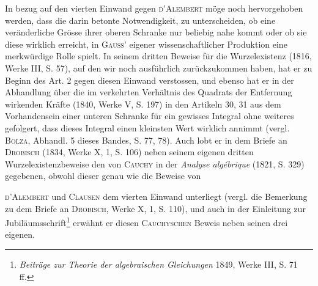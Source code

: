 In bezug auf den vierten Einwand gegen \textsc{d’Alembert} möge noch hervorgehoben
werden, dass die darin betonte Notwendigkeit, zu unterscheiden, ob
eine veränderliche Grösse ihrer oberen Schranke nur beliebig nahe kommt
oder ob sie diese wirklich erreicht, in \textsc{Gauss’} eigener wissenschaftlicher Produktion
eine merkwürdige Rolle spielt. In seinem dritten Beweise für die
Wurzelexistenz (1816, Werke III, S. 57), auf den wir noch ausführlich zurückzukommen
haben, hat er zu Beginn des Art. 2 gegen diesen Einwand verstossen,
und ebenso hat er in der Abhandlung über die im verkehrten Verhältnis
des Quadrats der Entfernung wirkenden Kräfte (1840, Werke V, S. 197)
in den Artikeln 30, 31 aus dem Vorhandensein einer unteren Schranke für
ein gewisses Integral ohne weiteres gefolgert, dass dieses Integral einen kleinsten
Wert wirklich annimmt (vergl. \textsc{Bolza}, Abhandl. 5 dieses Bandes, S. 77, 78).
Auch lobt er in dem Briefe an \textsc{Drobisch} (1834, Werke X, 1, S. 106) neben
seinem eigenen dritten Wurzelexistenzbeweise den von \textsc{Cauchy} in der \textit{Analyse
algébrique} (1821, S. 329) gegebenen, obwohl dieser genau wie die Beweise von\par
\clearpage{}
\noindent \textsc{d’Alembert} und \textsc{Clausen} dem vierten Einwand unterliegt (vergl. die Bemerkung
zu dem Briefe an \textsc{Drobisch}, Werke X, 1, S. 110), und auch in der Einleitung
zur Jubiläumsschrift\footnote{\textit{Beiträge zur Theorie der algebraischen Gleichungen} 1849, Werke III, S. 71 ff.} erwähnt er diesen \textsc{Cauchyschen} Beweis neben seinen
drei eigenen.

